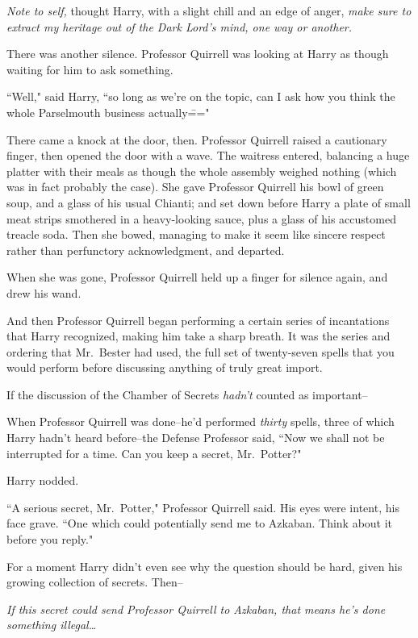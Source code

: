 \emph{Note to self,} thought Harry, with a slight chill and an edge of anger, \emph{make sure to extract my heritage out of the Dark Lord's mind, one way or another.}

There was another silence. Professor Quirrell was looking at Harry as though waiting for him to ask something.

``Well," said Harry, ``so long as we're on the topic, can I ask how you think the whole Parselmouth business actually\==="

There came a knock at the door, then. Professor Quirrell raised a cautionary finger, then opened the door with a wave. The waitress entered, balancing a huge platter with their meals as though the whole assembly weighed nothing (which was in fact probably the case). She gave Professor Quirrell his bowl of green soup, and a glass of his usual Chianti; and set down before Harry a plate of small meat strips smothered in a heavy-looking sauce, plus a glass of his accustomed treacle soda. Then she bowed, managing to make it seem like sincere respect rather than perfunctory acknowledgment, and departed.

When she was gone, Professor Quirrell held up a finger for silence again, and drew his wand.

And then Professor Quirrell began performing a certain series of incantations that Harry recognized, making him take a sharp breath. It was the series and ordering that Mr.~Bester had used, the full set of twenty-seven spells that you would perform before discussing anything of truly great import.

If the discussion of the Chamber of Secrets \emph{hadn't} counted as important\---

When Professor Quirrell was done\---he'd performed \emph{thirty} spells, three of which Harry hadn't heard before\---the Defense Professor said, ``Now we shall not be interrupted for a time. Can you keep a secret, Mr.~Potter?"

Harry nodded.

``A serious secret, Mr.~Potter," Professor Quirrell said. His eyes were intent, his face grave. ``One which could potentially send me to Azkaban. Think about it before you reply."

For a moment Harry didn't even see why the question should be hard, given his growing collection of secrets. Then\---

\emph{If this secret could send Professor Quirrell to Azkaban, that means he's done something illegal{\ldots}}

